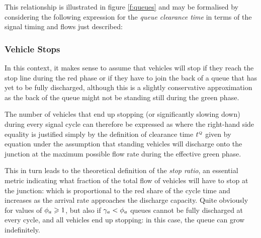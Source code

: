This relationship is illustrated in figure \ref{f:queues} and may be formalised by considering the following expression for the \emph{queue clearance time} in terms of the signal timing and flows just described:

\subsubsection*{Vehicle Stops}
In this context, it makes sense to assume that vehicles will stop if they reach the stop line during the red phase or if they have to join the back of a queue that has yet to be fully discharged, although this is a slightly conservative approximation as the back of the queue might not be standing still during the green phase.

The number of vehicles that end up stopping (or significantly slowing down) during every signal cycle can therefore be expressed as
where the right-hand side equality is justified simply by the definition of clearance time $t_{}^{\scriptscriptstyle{Q}}$ given by equation  under the assumption that standing vehicles will discharge onto the junction at the maximum possible flow rate during the effective green phase. 

This in turn leads to the theoretical definition of the \emph{stop ratio}, an essential metric indicating what fraction of the total flow of vehicles will have to stop at the junction:
which is proportional to the red share of the cycle time and increases as the arrival rate approaches the discharge capacity.
Quite obviously for values of $\phi_a \geqslant 1$, but also if $\gamma_{a} < \phi_a$ queues cannot be fully discharged at every cycle, and all vehicles end up stopping: in this case, the queue can grow indefinitely.


